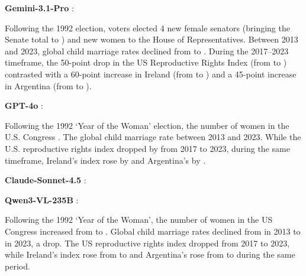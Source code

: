\documentclass{article} %
\begin{document}
\medskip
\noindent\textbf{Gemini-3.1-Pro} :
\begin{tcolorbox}[enhanced,breakable,colback=red!5,colframe=red!30,boxrule=0.4pt,arc=2pt,left=6pt,right=6pt,top=2pt,bottom=2pt]
\footnotesize
Following the 1992 election, voters elected 4 new female senators (bringing the
Senate total to ) and  new women to the House of Representatives.
Between 2013 and 2023, global child marriage rates declined from
 to .
During the 2017--2023 timeframe, the 50-point drop in the US Reproductive Rights
Index (from  to ) contrasted with a 60-point increase in Ireland
(from  to ) and a 45-point increase in Argentina
(from  to ).
\end{tcolorbox}

\noindent\textbf{GPT-4o} :
\begin{tcolorbox}[enhanced,breakable,colback=red!5,colframe=red!30,boxrule=0.4pt,arc=2pt,left=6pt,right=6pt,top=2pt,bottom=2pt]
\footnotesize
Following the 1992 `Year of the Woman' election, the number of women in the
U.S. Congress . The global child marriage rate
 between 2013 and 2023.
While the U.S. reproductive rights index dropped by  from 2017 to 2023,
during the same timeframe, Ireland's index rose by  and
Argentina's by .
\end{tcolorbox}

\noindent\textbf{Claude-Sonnet-4.5} :
\begin{tcolorbox}[enhanced,breakable,colback=red!5,colframe=red!30,boxrule=0.4pt,arc=2pt,left=6pt,right=6pt,top=2pt,bottom=2pt]
\footnotesize
{}
\end{tcolorbox}

\noindent\textbf{Qwen3-VL-235B} :
\begin{tcolorbox}[enhanced,breakable,colback=red!5,colframe=red!30,boxrule=0.4pt,arc=2pt,left=6pt,right=6pt,top=2pt,bottom=2pt]
\footnotesize
Following the 1992 `Year of the Woman', the number of women in the US Congress
increased from  to . Global child marriage rates declined from
 in 2013 to  in 2023, a  drop.
The US reproductive rights index dropped  from 2017 to 2023, while
Ireland's index rose from  to  and Argentina's rose from
 to  during the same period.
\end{tcolorbox}
\end{document}
